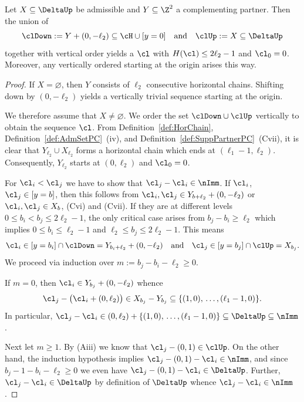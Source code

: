 \begin{theorem}
\label{thm:mesAfterAdShiftPC}
Let $X\subseteq \DeltaUp$ be 
admissible and $Y\subseteq\Z^2$ a 
complementing partner. Then the 
union of
$$
\clDown:=Y+(0,-\ell_2)\subseteq\cH
\cup[y=0]\quad\mbox{and}\quad 
\clUp:=X\subseteq\DeltaUp
$$
together with vertical order yields 
a {\mes} $\cl$ with $H(\cl)\leq2\ell_2-1$
and $\cl_0=0$. {Moreover, any
vertically ordered {\mes} starting at the origin 
arises this way.}
\end{theorem}

\begin{proof}
If $X=\varnothing$, then $Y$ consists of 
$\ell_2$ consecutive horizontal chains.
Shifting down by $(0,-\ell_2)$ yields 
a vertically trivial sequence starting 
at the origin. 

We therefore assume that $X\not=\varnothing$.
We order the set $\clDown\cup\clUp$ 
vertically to obtain the sequence $\cl$. 
From Definition~\ref{def:HorChain},
Definition~\ref{def:AdmSetPC}~(iv), and
Definition~\ref{def:SuppPartnerPC}~(Cvii), 
it is clear that $Y_{\ell_2}\cup X_{\ell_2}$ 
forms a horizontal chain which ends at 
$(\ell_1-1,\ell_2)$. Consequently, 
$Y_{\ell_2}$ starts at $(0,\ell_2)$ and
$\cl_0=0$.

For $\cl_i<\cl_j$ we have to show that 
$\cl_j-\cl_i\in\nImm$. If $\cl_i$, 
$\cl_j\in[y=b]$, then this follows from
$\cl_i,\cl_j\in Y_{b+\ell_2}+(0,-\ell_2)$ 
or $\cl_i,\cl_j\in X_b$,
(Cvi) and (Cvii). If they are at different levels 
$0\leq b_i<b_j\leq 2\ell_2-1$, the only
critical case arises from $b_j-b_i\geq \ell_2$
which implies $0\leq b_i\leq\ell_2-1$ and 
$\ell_2\leq b_j\leq2\ell_2-1$. This means
$$
\cl_i\in[y=b_i]\cap\clDown=Y_{b_i+\ell_2}+
(0,-\ell_2)\quad\mbox{and}\quad\cl_j\in[y=b_j]
\cap\clUp=X_{b_j}.
$$
We proceed via induction over $m:=b_j-b_i-
\ell_2\geq 0$. 

If $m=0$, then $\cl_i\in Y_{b_j}+(0,-\ell_2)$ 
whence
$$
\cl_j-\big(\cl_i+(0,\ell_2)\big)\in X_{b_j}-Y_{b_j}
\subseteq\{(1,0),\,\ldots, (\ell_1-1,0)\}.
$$
In particular,  
$\cl_j-\cl_i\in (0,\ell_2)+\{(1,0),\,\ldots,
(\ell_1-1,0)\}\subseteq\DeltaUp\subseteq\nImm$.

Next let $m\geq 1$. By (Aiii) we know that
$\cl_j-(0,1)\in\clUp$. On the other hand,
the induction hypothesis implies $\cl_j-(0,1)
-\cl_i\in\nImm$, and since $b_j-1-b_i-\ell_2
\geq0$ we even have $\cl_j-(0,1)-\cl_i\in
\DeltaUp$. Further, $\cl_j-\cl_i\in\DeltaUp$ 
by definition of $\DeltaUp$ whence $\cl_j-\cl_i
\in\nImm$.


\end{proof}
